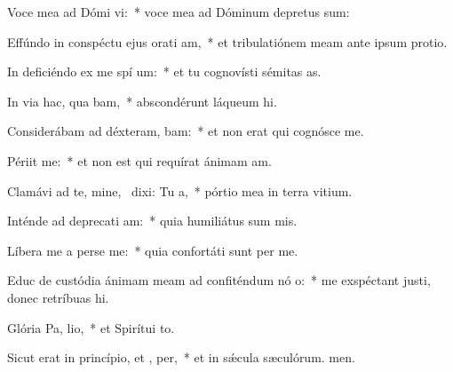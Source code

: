 \item Voce mea ad Dómi vi:~* voce mea ad Dóminum depretus sum:
\item Effúndo in conspéctu ejus orati am,~* et tribulatiónem meam ante ipsum protio.
\item In deficiéndo ex me spí um:~* et tu cognovísti sémitas as.
\item In via hac, qua bam,~* abscondérunt láqueum hi.
\item Considerábam ad déxteram,  bam:~* et non erat qui cognósce me.
\item Périit   me:~* et non est qui requírat ánimam am.
\item Clamávi ad te, mine,~\pscross{} dixi: Tu   a,~* pórtio mea in terra vitium.
\item Inténde ad deprecati am:~* quia humiliátus sum mis.
\item Líbera me a perse me:~* quia confortáti sunt per me.
\item Educ de custódia ánimam meam ad confiténdum nó o:~* me exspéctant justi, donec retríbuas hi.
\item Glória Pa,  lio,~* et Spirítui to.
\item Sicut erat in princípio, et ,  per,~* et in sǽcula sæculórum. men.
